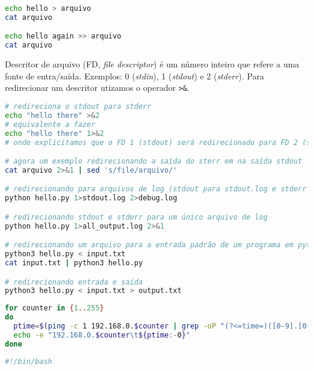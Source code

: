 \begin{frame}
\begin{lstlisting}[language=bash, label=lst-bash-redirecionamento, caption={Redirecionamento.}, postbreak=\mbox{$\hookrightarrow$\space}, basicstyle=\fontsize{8}{10}\selectfont\ttfamily]
echo hello > arquivo
cat arquivo

echo hello again >> arquivo
cat arquivo
\end{lstlisting}

\framebreak
Descritor de arquivo (FD, \emph{file descriptor}) é um número inteiro que refere a uma fonte de entra/saída.
Exemplos: 0 (\emph{stdin}), 1 (\emph{stdout}) e 2 (\emph{stderr}). Para redirecionar um descritor utizamos o operador \verb|>&|.
\begin{lstlisting}[language=bash, label=lst-bash-descritores, caption={Descritores de arquivos.}, postbreak=\mbox{$\hookrightarrow$\space}, basicstyle=\fontsize{8}{10}\selectfont\ttfamily]
# redireciona o stdout para stderr
echo "hello there" >&2
# equivalente a fazer
echo "hello there" 1>&2
# onde explicitamos que o FD 1 (stdout) será redirecionado para FD 2 (stderr)

# agora um exemplo redirecionando a saída do sterr em na saída stdout
cat arquivo 2>&1 | sed 's/file/arquivo/'

# redirecionando para arquivos de log (stdout para stdout.log e stderr para debug.log)
python hello.py 1>stdout.log 2>debug.log

# redirecionando stdout e stderr para um único arquivo de log
python hello.py 1>all_output.log 2>&1

# redirecionando um arquivo para a entrada padrão de um programa em python
python3 hello.py < input.txt
cat input.txt | python3 hello.py

# redirecionando entrada e saída
python3 hello.py < input.txt > output.txt
\end{lstlisting}




\framebreak

\begin{lstlisting}[language=bash, label=lst-bash-ping-loop, caption={Tempo de ping nas máquinas.}, postbreak=\mbox{$\hookrightarrow$\space}, basicstyle=\fontsize{8}{10}\selectfont\ttfamily]
for counter in {1..255}
do 
  ptime=$(ping -c 1 192.168.0.$counter | grep -oP "(?<=time=)([0-9].[0-9]+)")
  echo -e "192.168.0.$counter\t${ptime:-0}"
done
\end{lstlisting}

\framebreak

\begin{lstlisting}[language=bash, label=lst-bash-if, caption={if else em Bash.}, postbreak=\mbox{$\hookrightarrow$\space}, basicstyle=\fontsize{8}{10}\selectfont\ttfamily]
#!/bin/bash


\end{lstlisting}
\end{frame}
